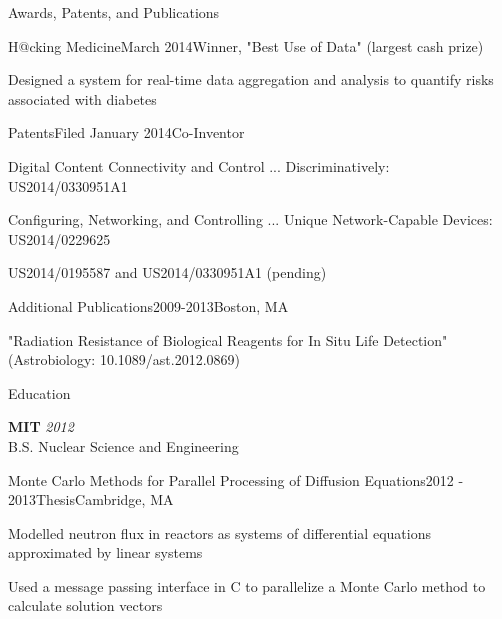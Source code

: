 \documentclass{resume}
\begin{document}
\begin{rSection}{Awards, Patents, and Publications}

\begin{rSubsection}{H@cking Medicine}{March 2014}{Winner, "Best Use of Data" (largest cash prize)}{}
\item Designed a system for real-time data aggregation and analysis to quantify risks associated with diabetes
\end{rSubsection}



\begin{rSubsection}{Patents}{Filed January 2014}{Co-Inventor}{}
\item Digital Content Connectivity and Control ... Discriminatively: US2014/0330951A1
\item Configuring, Networking, and Controlling ... Unique Network-Capable Devices: US2014/0229625
\item US2014/0195587 and US2014/0330951A1 (pending)
\end{rSubsection}

\begin{rSubsection}{Additional Publications}{2009-2013}{}{Boston, MA}
\item "Radiation Resistance of Biological Reagents for In Situ Life Detection" (Astrobiology: 10.1089/ast.2012.0869)
\end{rSubsection}

\end{rSection}

\begin{rSection}{Education}

{\bf MIT} \hfill {\em 2012} \\ 
B.S. Nuclear Science and Engineering


\begin{rSubsection}{Monte Carlo Methods for Parallel Processing of Diffusion Equations}{2012 - 2013}{Thesis}{Cambridge, MA}
\item Modelled neutron flux in reactors as systems of differential equations approximated by linear systems
\item Used a message passing interface in C to parallelize a Monte Carlo method to calculate solution vectors
\end{rSubsection}

\end{rSection}
\end{document}

